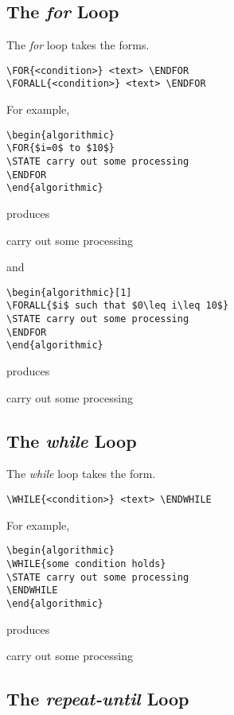 \documentclass{article}
\begin{document}
\subsection{The {\em for} Loop}

The {\em for} loop takes the forms.
\begin{verbatim}
\FOR{<condition>} <text> \ENDFOR
\FORALL{<condition>} <text> \ENDFOR
\end{verbatim}
For example,
\begin{verbatim}
\begin{algorithmic}
\FOR{$i=0$ to $10$}
\STATE carry out some processing 
\ENDFOR
\end{algorithmic}
\end{verbatim}
produces
\begin{algorithmic}
\STATE carry out some processing 
\ENDFOR
\end{algorithmic}
and
\begin{verbatim}
\begin{algorithmic}[1]
\FORALL{$i$ such that $0\leq i\leq 10$}
\STATE carry out some processing 
\ENDFOR
\end{algorithmic}
\end{verbatim}
produces
\begin{algorithmic}[1]
\STATE carry out some processing 
\ENDFOR
\end{algorithmic}

\subsection{The {\em while} Loop}

The {\em while} loop takes the form.
\begin{verbatim}
\WHILE{<condition>} <text> \ENDWHILE
\end{verbatim}
For example,
\begin{verbatim}
\begin{algorithmic}
\WHILE{some condition holds}
\STATE carry out some processing 
\ENDWHILE
\end{algorithmic}
\end{verbatim}
produces
\begin{algorithmic}
\STATE carry out some processing 
\ENDWHILE
\end{algorithmic}

\subsection{The {\em repeat-until} Loop}
\end{document}
